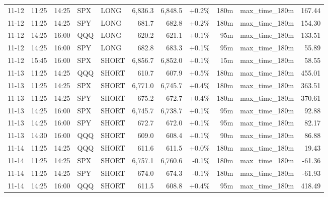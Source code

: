 \documentclass[11pt,a4paper,twoside]{article}
\begin{document}
\begin{center}
\begin{longtable}{>{\color{txtmain}}l l l l l r r r r >{\color{txtmain}}l r}
11-12 & 11:25 & 14:25 & SPX & LONG & 6,836.3 & 6,848.5 & \textcolor{wingreen}{+0.2\%} & 180m & max\_time\_180m & \textcolor{wingreen}{167.44} \\
11-12 & 11:25 & 14:25 & SPY & LONG & 681.7 & 682.8 & \textcolor{wingreen}{+0.2\%} & 180m & max\_time\_180m & \textcolor{wingreen}{154.30} \\
11-12 & 14:25 & 16:00 & QQQ & LONG & 620.2 & 621.1 & \textcolor{wingreen}{+0.1\%} & 95m & max\_time\_180m & \textcolor{wingreen}{133.51} \\
11-12 & 14:25 & 16:00 & SPY & LONG & 682.8 & 683.3 & \textcolor{wingreen}{+0.1\%} & 95m & max\_time\_180m & \textcolor{wingreen}{55.89} \\
11-12 & 15:45 & 16:00 & SPX & SHORT & 6,856.7 & 6,852.0 & \textcolor{wingreen}{+0.1\%} & 15m & max\_time\_180m & \textcolor{wingreen}{58.55} \\
11-13 & 11:25 & 14:25 & QQQ & SHORT & 610.7 & 607.9 & \textcolor{wingreen}{+0.5\%} & 180m & max\_time\_180m & \textcolor{wingreen}{455.01} \\
11-13 & 11:25 & 14:25 & SPX & SHORT & 6,771.0 & 6,745.7 & \textcolor{wingreen}{+0.4\%} & 180m & max\_time\_180m & \textcolor{wingreen}{363.51} \\
11-13 & 11:25 & 14:25 & SPY & SHORT & 675.2 & 672.7 & \textcolor{wingreen}{+0.4\%} & 180m & max\_time\_180m & \textcolor{wingreen}{370.61} \\
11-13 & 14:25 & 16:00 & SPX & SHORT & 6,745.7 & 6,738.7 & \textcolor{wingreen}{+0.1\%} & 95m & max\_time\_180m & \textcolor{wingreen}{92.88} \\
11-13 & 14:25 & 16:00 & SPY & SHORT & 672.7 & 672.0 & \textcolor{wingreen}{+0.1\%} & 95m & max\_time\_180m & \textcolor{wingreen}{82.17} \\
11-13 & 14:30 & 16:00 & QQQ & SHORT & 609.0 & 608.4 & \textcolor{wingreen}{+0.1\%} & 90m & max\_time\_180m & \textcolor{wingreen}{86.88} \\
11-14 & 11:25 & 14:25 & QQQ & SHORT & 611.6 & 611.5 & \textcolor{wingreen}{+0.0\%} & 180m & max\_time\_180m & \textcolor{wingreen}{19.43} \\
11-14 & 11:25 & 14:25 & SPX & SHORT & 6,757.1 & 6,760.6 & \textcolor{lossred}{-0.1\%} & 180m & max\_time\_180m & \textcolor{lossred}{-61.36} \\
11-14 & 11:25 & 14:25 & SPY & SHORT & 674.0 & 674.3 & \textcolor{lossred}{-0.1\%} & 180m & max\_time\_180m & \textcolor{lossred}{-61.93} \\
11-14 & 14:25 & 16:00 & QQQ & SHORT & 611.5 & 608.8 & \textcolor{wingreen}{+0.4\%} & 95m & max\_time\_180m & \textcolor{wingreen}{418.49} \\

\end{longtable}
\end{center}
\end{document}
